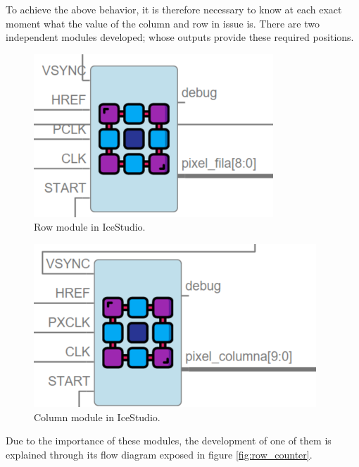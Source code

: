 To achieve the above behavior, it is therefore necessary to know at each exact moment what the value of the column and row in issue is.\newline
There are two independent modules developed; whose outputs provide these required positions.
	
	\begin{figure}[H]
		\center
		\includegraphics[scale=0.6, angle=0]{imagenes/Cuadricoptero_vision/filas_module}
		\caption{Row module in IceStudio.}
		\label{fig:filas_module}
	\end{figure}
	
	\begin{figure}[H]
		\center
		\includegraphics[scale=0.6, angle=0]{imagenes/Cuadricoptero_vision/columnas_module}
		\caption{Column module in IceStudio.}
		\label{fig:columnas_module}
	\end{figure}
	

	Due to the importance of these modules, the development of one of them is explained through its flow diagram exposed in figure \ref{fig:row_counter}.
	

